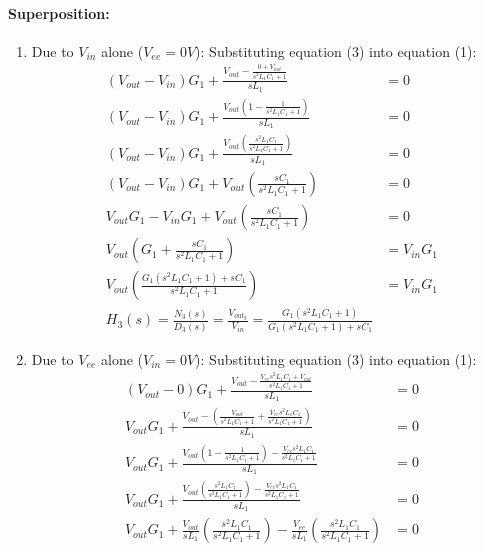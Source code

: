 \begin{enumerate}
    \paragraph{Superposition:}
      \begin{enumerate}
        \item Due to \(V_{in}\) alone (\(V_{ee} = 0V\)):
          Substituting equation (3) into equation (1):
          \begin{align*}
            (V_{out} - V_{in})G_1 + \frac{V_{out} - \frac{0 + V_{out}}{s^2L_1C_1 + 1}}{sL_1} &= 0 \\
            (V_{out} - V_{in})G_1 + \frac{V_{out}\left(1 - \frac{1}{s^2L_1C_1 + 1}\right)}{sL_1} &= 0 \\
            (V_{out} - V_{in})G_1 + \frac{V_{out}\left(\frac{s^2L_1C_1}{s^2L_1C_1 + 1}\right)}{sL_1} &= 0 \\
            (V_{out} - V_{in})G_1 + V_{out}\left(\frac{sC_1}{s^2L_1C_1 + 1}\right) &= 0 \\
            V_{out}G_1 - V_{in}G_1 + V_{out}\left(\frac{sC_1}{s^2L_1C_1 + 1}\right) &= 0 \\
            V_{out}\left(G_1 + \frac{sC_1}{s^2L_1C_1 + 1}\right) &= V_{in}G_1 \\
            V_{out}\left(\frac{G_1(s^2L_1C_1 + 1) + sC_1}{s^2L_1C_1 + 1}\right) &= V_{in}G_1 \\
            \boxed{H_3(s) = \frac{N_3(s)}{D_3(s)} = \frac{V_{out_3}}{V_{in}} = \frac{G_1(s^2L_1C_1 + 1)}{G_1(s^2L_1C_1 + 1) + sC_1}}
          \end{align*}
        \item Due to \(V_{ee}\) alone (\(V_{in} = 0V\)):
          Substituting equation (3) into equation (1):
          \begin{align*}
            (V_{out} - 0)G_1 + \frac{V_{out} - \frac{V_{ee}s^2L_1C_1 + V_{out}}{s^2L_1C_1 + 1}}{sL_1} &= 0 \\
            V_{out}G_1 + \frac{V_{out} - \left(\frac{V_{out}}{s^2L_1C_1 + 1} + \frac{V_{ee}s^2L_1C_1}{s^2L_1C_1 + 1}\right)}{sL_1} &= 0 \\
            V_{out}G_1 + \frac{V_{out}\left(1 - \frac{1}{s^2L_1C_1 + 1}\right) - \frac{V_{ee}s^2L_1C_1}{s^2L_1C_1 + 1}}{sL_1} &= 0 \\
            V_{out}G_1 + \frac{V_{out}\left(\frac{s^2L_1C_1}{s^2L_1C_1 + 1}\right) - \frac{V_{ee}s^2L_1C_1}{s^2L_1C_1 + 1}}{sL_1} &= 0 \\
            V_{out}G_1 + \frac{V_{out}}{sL_1}\left(\frac{s^2L_1C_1}{s^2L_1C_1 + 1}\right) - \frac{V_{ee}}{sL_1}\left(\frac{s^2L_1C_1}{s^2L_1C_1 + 1}\right) &= 0 \\

\end{align*}
\end{enumerate}
\end{enumerate}
